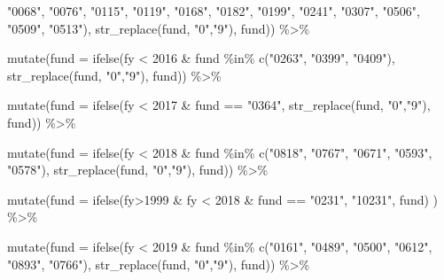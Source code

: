 \documentclass[
  letterpaper,
  DIV=11,
  numbers=noendperiod]{scrreport}
\newenvironment{Shaded}{\begin{snugshade}}{\end{snugshade}}
\newcommand{\AttributeTok}[1]{\textcolor[rgb]{0.40,0.45,0.13}{#1}}
\newcommand{\DecValTok}[1]{\textcolor[rgb]{0.68,0.00,0.00}{#1}}
\newcommand{\FunctionTok}[1]{\textcolor[rgb]{0.28,0.35,0.67}{#1}}
\newcommand{\NormalTok}[1]{\textcolor[rgb]{0.00,0.23,0.31}{#1}}
\newcommand{\SpecialCharTok}[1]{\textcolor[rgb]{0.37,0.37,0.37}{#1}}
\newcommand{\StringTok}[1]{\textcolor[rgb]{0.13,0.47,0.30}{#1}}
\begin{document}
\begin{Shaded}
\begin{Highlighting}[]
\StringTok{"0068"}\NormalTok{, }\StringTok{"0076"}\NormalTok{, }\StringTok{"0115"}\NormalTok{, }\StringTok{"0119"}\NormalTok{, }\StringTok{"0168"}\NormalTok{, }\StringTok{"0182"}\NormalTok{, }\StringTok{"0199"}\NormalTok{, }\StringTok{"0241"}\NormalTok{, }\StringTok{"0307"}\NormalTok{, }\StringTok{"0506"}\NormalTok{, }\StringTok{"0509"}\NormalTok{, }\StringTok{"0513"}\NormalTok{), }\FunctionTok{str\_replace}\NormalTok{(fund, }\StringTok{"0"}\NormalTok{,}\StringTok{"9"}\NormalTok{), fund)) }\SpecialCharTok{\%\textgreater{}\%}
  
  \FunctionTok{mutate}\NormalTok{(}\AttributeTok{fund =} \FunctionTok{ifelse}\NormalTok{(fy }\SpecialCharTok{\textless{}} \DecValTok{2016} \SpecialCharTok{\&}\NormalTok{ fund }\SpecialCharTok{\%in\%} \FunctionTok{c}\NormalTok{(}\StringTok{"0263"}\NormalTok{, }\StringTok{"0399"}\NormalTok{, }\StringTok{"0409"}\NormalTok{), }\FunctionTok{str\_replace}\NormalTok{(fund, }\StringTok{"0"}\NormalTok{,}\StringTok{"9"}\NormalTok{), fund)) }\SpecialCharTok{\%\textgreater{}\%}

  \FunctionTok{mutate}\NormalTok{(}\AttributeTok{fund =}  \FunctionTok{ifelse}\NormalTok{(fy }\SpecialCharTok{\textless{}} \DecValTok{2017} \SpecialCharTok{\&}\NormalTok{ fund }\SpecialCharTok{==} \StringTok{"0364"}\NormalTok{, }\FunctionTok{str\_replace}\NormalTok{(fund, }\StringTok{"0"}\NormalTok{,}\StringTok{"9"}\NormalTok{), fund)) }\SpecialCharTok{\%\textgreater{}\%}

  \FunctionTok{mutate}\NormalTok{(}\AttributeTok{fund =}  \FunctionTok{ifelse}\NormalTok{(fy }\SpecialCharTok{\textless{}} \DecValTok{2018} \SpecialCharTok{\&}\NormalTok{ fund }\SpecialCharTok{\%in\%} \FunctionTok{c}\NormalTok{(}\StringTok{"0818"}\NormalTok{, }\StringTok{"0767"}\NormalTok{, }\StringTok{"0671"}\NormalTok{, }\StringTok{"0593"}\NormalTok{, }\StringTok{"0578"}\NormalTok{), }\FunctionTok{str\_replace}\NormalTok{(fund, }\StringTok{"0"}\NormalTok{,}\StringTok{"9"}\NormalTok{), fund)) }\SpecialCharTok{\%\textgreater{}\%}

  \FunctionTok{mutate}\NormalTok{(}\AttributeTok{fund =} \FunctionTok{ifelse}\NormalTok{(fy}\SpecialCharTok{\textgreater{}}\DecValTok{1999} \SpecialCharTok{\&}\NormalTok{ fy }\SpecialCharTok{\textless{}} \DecValTok{2018} \SpecialCharTok{\&}\NormalTok{ fund }\SpecialCharTok{==} \StringTok{"0231"}\NormalTok{, }\StringTok{"10231"}\NormalTok{, fund) ) }\SpecialCharTok{\%\textgreater{}\%}
  
  \FunctionTok{mutate}\NormalTok{(}\AttributeTok{fund =} \FunctionTok{ifelse}\NormalTok{(fy }\SpecialCharTok{\textless{}} \DecValTok{2019} \SpecialCharTok{\&}\NormalTok{ fund }\SpecialCharTok{\%in\%} \FunctionTok{c}\NormalTok{(}\StringTok{"0161"}\NormalTok{, }\StringTok{"0489"}\NormalTok{, }\StringTok{"0500"}\NormalTok{, }\StringTok{"0612"}\NormalTok{, }\StringTok{"0893"}\NormalTok{, }\StringTok{"0766"}\NormalTok{), }\FunctionTok{str\_replace}\NormalTok{(fund, }\StringTok{"0"}\NormalTok{,}\StringTok{"9"}\NormalTok{), fund)) }\SpecialCharTok{\%\textgreater{}\%}


\end{Highlighting}
\end{Shaded}
\end{document}
